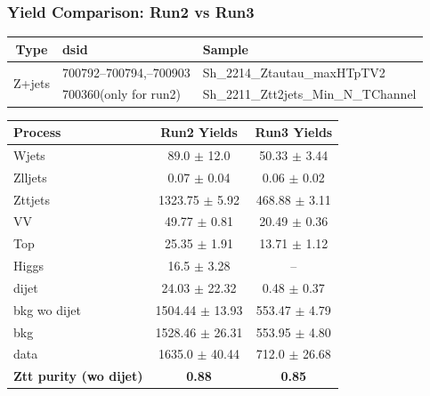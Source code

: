 \documentclass[usenames,dvipsnames]{beamer}
\begin{document}
\begin{frame}
\frametitle{Yield Comparison: Run2 vs Run3}
\scriptsize
\centering

\vspace{-0.5em}
\begin{tabular}{|c|l|l|}
\hline
\textbf{Type} & \textbf{dsid} & \textbf{Sample} \\
\hline
\multirow{2}{*}{Z+jets} 
  & 700792--700794,\quad 700901--700903 & Sh\_2214\_Ztautau\_maxHTpTV2 \\
  & 700360(only for run2) & Sh\_2211\_Ztt2jets\_Min\_N\_TChannel \\
\hline
\end{tabular}

\vspace{1em}

\begin{tabular}{|l|c|c|}
\hline
\textbf{Process} & \textbf{Run2 Yields} & \textbf{Run3 Yields} \\
\hline
Wjets          & 89.0 $\pm$ 12.0     & 50.33 $\pm$ 3.44     \\
Zlljets        & 0.07 $\pm$ 0.04     & 0.06 $\pm$ 0.02      \\
Zttjets        & 1323.75 $\pm$ 5.92  & 468.88 $\pm$ 3.11    \\
VV             & 49.77 $\pm$ 0.81    & 20.49 $\pm$ 0.36     \\
Top            & 25.35 $\pm$ 1.91    & 13.71 $\pm$ 1.12     \\
Higgs          & 16.5 $\pm$ 3.28     & --                   \\
dijet          & 24.03 $\pm$ 22.32   & 0.48 $\pm$ 0.37      \\
\hline
bkg wo dijet   & 1504.44 $\pm$ 13.93 & 553.47 $\pm$ 4.79    \\
bkg            & 1528.46 $\pm$ 26.31 & 553.95 $\pm$ 4.80    \\
data           & 1635.0 $\pm$ 40.44  & 712.0 $\pm$ 26.68    \\
\hline
\textbf{Ztt purity (wo dijet)} & \textbf{0.88} & \textbf{0.85} \\
\hline
\end{tabular}

\end{frame}
\end{document}

